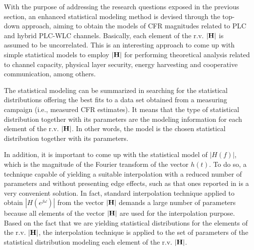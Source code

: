 \documentclass[journal]{IEEEtran}
\begin{document}
With the purpose of addressing the research questions exposed in the previous section, an enhanced statistical modeling method is devised through the top-down approach, aiming to obtain the models of \ac{CFR} magnitudes related to \ac{PLC} and hybrid \ac{PLC}-\ac{WLC} channels. Basically, each element of the \ac{r.v.} ${\bf |H|}$ is assumed to be uncorrelated. This is an interesting approach to come up with simple statistical models to employ ${\bf |H|}$ for performing theoretical analysis related to channel capacity, physical layer security, energy harvesting and cooperative communication, among others.

The statistical modeling can be summarized in searching for the statistical distributions offering the best fits to a data set obtained from a measuring campaign (i.e., measured \ac{CFR} estimates). It means that the type of statistical distribution together with its parameters are the modeling information for each element of the \ac{r.v.}  ${\bf |H|}$. In other words, the model is the chosen statistical distribution together with its parameters.

In addition, it is important to come up with the statistical model of $|H(f)|$, which is the magnitude of the Fourier transform of the vector $h(t)$. To do so, a technique capable of yielding a suitable interpolation with a reduced number of parameters and without presenting edge effects, such as that ones reported in \cite{Luis:AI} is a very convenient solution. In fact, standard interpolation technique applied to obtain $|H(e^{j\omega})|$ from the vector $\bf |H|$ demands a large number of parameters \cite{mitra} because all elements of the vector $\bf |H|$ are used for the interpolation purpose. Based on the fact that we are yielding statistical distributions for the elements of the \ac{r.v.} $\bf |H|$, the interpolation technique is applied to the set of parameters of the statistical distribution modeling each element of the \ac{r.v.} $\bf |H|$.
\end{document}
